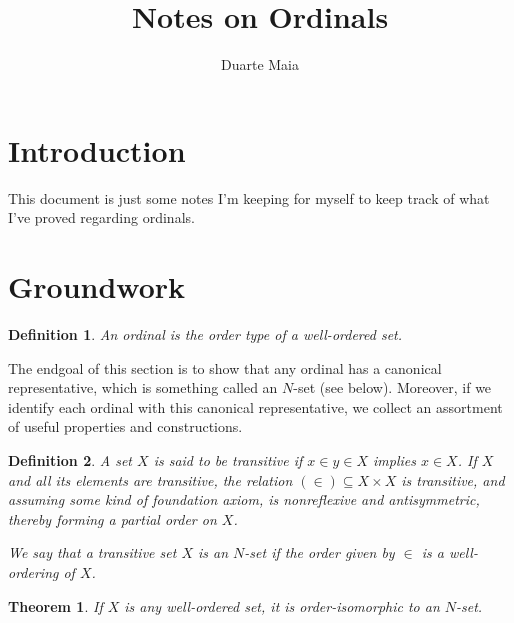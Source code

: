 \documentclass{article}
\title{Notes on Ordinals}
\author{Duarte Maia}
\newtheorem{theorem}{Theorem}
\newtheorem{definition}{Definition}
\theoremstyle{nonumberplain}
\begin{document}
\maketitle

\section{Introduction}

This document is just some notes I'm keeping for myself to keep track of what I've proved regarding ordinals.

\section{Groundwork}

\begin{definition}
An ordinal is the order type of a well-ordered set.
\end{definition}

The endgoal of this section is to show that any ordinal has a canonical representative, which is something called an $N$-set (see below). Moreover, if we identify each ordinal with this canonical representative, we collect an assortment of useful properties and constructions.

\begin{definition}
A set $X$ is said to be transitive if $x \in y \in X$ implies $x \in X$. If $X$ and all its elements are transitive, the relation $(\in) \subseteq X \times X$ is transitive, and assuming some kind of foundation axiom, is nonreflexive and antisymmetric, thereby forming a partial order on $X$.

We say that a transitive set $X$ is an $N$-set if the order given by $\in$ is a well-ordering of $X$.
\end{definition}

\begin{theorem}
If $X$ is any well-ordered set, it is order-isomorphic to an $N$-set.
\end{theorem}
\end{document}

